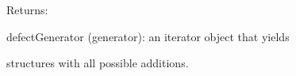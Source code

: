 \documentclass[letterpaper,10pt,english]{sphinxmanual}
\begin{document}
\begin{fulllineitems}
\begin{DUlineblock}{0em}
\begin{DUlineblock}{\DUlineblockindent}
\begin{DUlineblock}{\DUlineblockindent}
\end{DUlineblock}
\end{DUlineblock}
\item[] Returns:
\item[]
\begin{DUlineblock}{\DUlineblockindent}
\item[] defectGenerator (generator): an iterator object that yields
\item[]
\begin{DUlineblock}{\DUlineblockindent}
\item[] structures with all possible additions.
\end{DUlineblock}
\end{DUlineblock}
\end{DUlineblock}

\end{fulllineitems}

\end{document}
